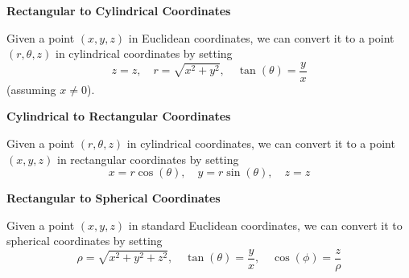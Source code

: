 \documentclass{article}
\newenvironment{definition}[1]{
    \par\noindent\textbf{#1}\par\noindent
}{
    \par \vspace{0.5cm}
}
\begin{document}
\begin{center}
\end{center}


\begin{definition}{Rectangular to Cylindrical Coordinates}
    Given a point \( (x, y, z) \) in Euclidean coordinates, we can convert it to a point \( (r, \theta, z) \) in cylindrical coordinates by setting
    \[ z = z, \quad r = \sqrt{x^2 + y^2}, \quad \tan(\theta) = \frac{y}{x} \] (assuming \( x \neq 0 \)).
\end{definition}


\begin{definition}{Cylindrical to Rectangular Coordinates}
    Given a point \( (r, \theta, z) \) in cylindrical coordinates, we can convert it to a point \( (x, y, z) \) in rectangular coordinates by setting
    \[ x = r \cos(\theta), \quad y = r \sin(\theta), \quad z = z \]
\end{definition}


\begin{definition}{Rectangular to Spherical Coordinates}
    Given a point \( (x, y, z) \) in standard Euclidean coordinates, we can convert it to spherical coordinates by setting
    \[ \rho = \sqrt{x^2 + y^2 + z^2}, \quad \tan(\theta) = \frac{y}{x}, \quad \cos(\phi) = \frac{z}{\rho} \]
\end{definition}
\end{document}
